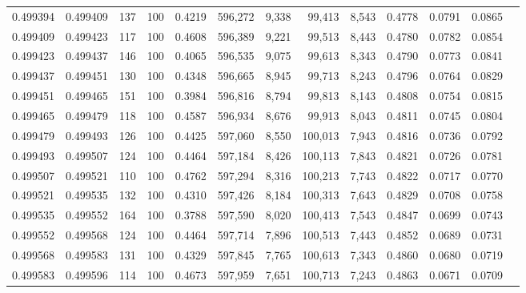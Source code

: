 \begin{tabular}{rrrrrrrrrrrrr}
0.499394 & 0.499409 &   137 & 100 &                                     0.4219 & 596,272 &   9,338 &  99,413 &   8,543 & 0.4778 & 0.0791 & 0.0865 \\
0.499409 & 0.499423 &   117 & 100 &                                     0.4608 & 596,389 &   9,221 &  99,513 &   8,443 & 0.4780 & 0.0782 & 0.0854 \\
0.499423 & 0.499437 &   146 & 100 &                                     0.4065 & 596,535 &   9,075 &  99,613 &   8,343 & 0.4790 & 0.0773 & 0.0841 \\
0.499437 & 0.499451 &   130 & 100 &                                     0.4348 & 596,665 &   8,945 &  99,713 &   8,243 & 0.4796 & 0.0764 & 0.0829 \\
0.499451 & 0.499465 &   151 & 100 &                                     0.3984 & 596,816 &   8,794 &  99,813 &   8,143 & 0.4808 & 0.0754 & 0.0815 \\
0.499465 & 0.499479 &   118 & 100 &                                     0.4587 & 596,934 &   8,676 &  99,913 &   8,043 & 0.4811 & 0.0745 & 0.0804 \\
0.499479 & 0.499493 &   126 & 100 &                                     0.4425 & 597,060 &   8,550 & 100,013 &   7,943 & 0.4816 & 0.0736 & 0.0792 \\
0.499493 & 0.499507 &   124 & 100 &                                     0.4464 & 597,184 &   8,426 & 100,113 &   7,843 & 0.4821 & 0.0726 & 0.0781 \\
0.499507 & 0.499521 &   110 & 100 &                                     0.4762 & 597,294 &   8,316 & 100,213 &   7,743 & 0.4822 & 0.0717 & 0.0770 \\
0.499521 & 0.499535 &   132 & 100 &                                     0.4310 & 597,426 &   8,184 & 100,313 &   7,643 & 0.4829 & 0.0708 & 0.0758 \\
0.499535 & 0.499552 &   164 & 100 &                                     0.3788 & 597,590 &   8,020 & 100,413 &   7,543 & 0.4847 & 0.0699 & 0.0743 \\
0.499552 & 0.499568 &   124 & 100 &                                     0.4464 & 597,714 &   7,896 & 100,513 &   7,443 & 0.4852 & 0.0689 & 0.0731 \\
0.499568 & 0.499583 &   131 & 100 &                                     0.4329 & 597,845 &   7,765 & 100,613 &   7,343 & 0.4860 & 0.0680 & 0.0719 \\
0.499583 & 0.499596 &   114 & 100 &                                     0.4673 & 597,959 &   7,651 & 100,713 &   7,243 & 0.4863 & 0.0671 & 0.0709 \\

\end{tabular}
